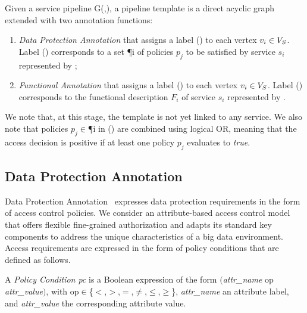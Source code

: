 \begin{definition} \label{def:template}
  Given a service pipeline G(\V,\E), a pipeline template \tChartFunction is a direct acyclic graph extended with two annotation functions:
  \begin{enumerate}%
    \item \emph{Data Protection Annotation} \myLambda that assigns a label \myLambda() to each vertex $v_{i}\in V_S$. Label \myLambda() corresponds to a set \P{i} of policies $p_j$ to be satisfied by service $s_i$ represented by ;
    \item \emph{Functional Annotation} \myGamma that assigns a label \myGamma() to each vertex $v_{i}\in V_S$. Label \myGamma() corresponds to the functional description $F_i$ of service $s_i$ represented by .
  \end{enumerate}
\end{definition}

\vspace{0.5em}

We note that, at this stage, the template is not yet linked to any service.
We also note that policies $p_j$$\in$\P{i} in \myLambda() are combined using logical OR, meaning that the access decision is positive if at least one policy $p_j$ evaluates to \emph{true}.

      \subsection{Data Protection Annotation}\label{sec:nonfuncannotation}
      Data Protection Annotation \myLambda\ expresses data protection requirements in the form of access control policies. We consider an attribute-based access control model that offers flexible fine-grained authorization and adapts its standard key components to address the unique characteristics of a big data environment. Access requirements are expressed in the form of policy conditions that are defined as follows.

      \vspace{0.5em}

      \begin{definition}\label{def:policy_cond}
        A \emph{Policy Condition pc} is a Boolean expression of the form $($\emph{attr\_name} op \emph{attr\_value}$)$, with op$\in$\{$<$,$>$,$=$,$\neq$,$\leq$,$\geq$\}, \emph{attr\_name} an attribute label, and \emph{attr\_value} the corresponding attribute value.
      \end{definition}

